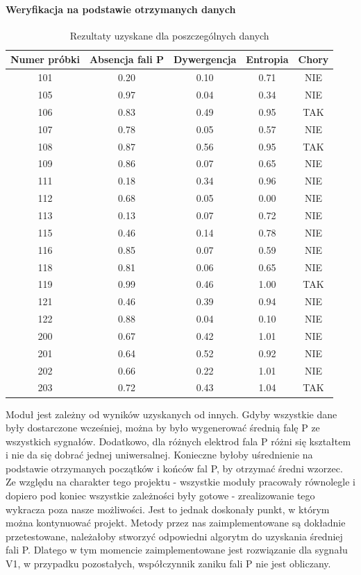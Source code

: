 \paragraph{Weryfikacja na podstawie otrzymanych danych}

\begin{table}[ht]

\centering
    \begin{tabular}{c c c c c}
    \hline \hline
    Numer próbki & Absencja fali P &Dywergencja & Entropia &Chory \\
    \hline
    101 &0.20 &0.10 &0.71 &NIE\\
    105 &0.97 &0.04 &0.34 &NIE\\
    106 &0.83 &0.49 &0.95 &TAK\\
    107 &0.78 &0.05 &0.57 &NIE\\
    108 &0.87 &0.56 &0.95 &TAK\\
    109 &0.86 &0.07 &0.65 &NIE\\
    111 &0.18 &0.34 &0.96 &NIE\\
    112 &0.68 &0.05 &0.00 &NIE\\
    113 &0.13 &0.07 &0.72 &NIE\\
    115 &0.46 &0.14 &0.78 &NIE\\
    116 &0.85 &0.07 &0.59 &NIE\\
    118 &0.81 &0.06 &0.65 &NIE\\
    119 &0.99 &0.46 &1.00 &TAK\\
    121 &0.46 &0.39 &0.94 &NIE\\
    122 &0.88 &0.04 &0.10 &NIE\\
    200 &0.67 &0.42 &1.01 &NIE\\
    201 &0.64 &0.52 &0.92 &NIE\\
    202 &0.66 &0.22 &1.01 &NIE\\
    203 &0.72 &0.43 &1.04 &TAK\\
    \hline
    \end{tabular}
    \caption{Rezultaty uzyskane dla poszczególnych danych}\label{table:wynikiAtrialFibr}
\end{table}

Moduł jest zależny od wyników uzyskanych od innych. 
Gdyby wszystkie dane były dostarczone wcześniej, można by było wygenerować średnią falę P ze wszystkich sygnałów.
Dodatkowo, dla różnych elektrod fala P różni się kształtem i nie da się dobrać jednej uniwersalnej.
Konieczne byłoby uśrednienie na podstawie otrzymanych początków i końców fal P, by otrzymać średni wzorzec.
Ze względu na charakter tego projektu - wszystkie moduły pracowały równolegle i dopiero pod koniec wszystkie zależności były gotowe - 
zrealizowanie tego wykracza poza nasze możliwości.
Jest to jednak doskonały punkt, w którym można kontynuować projekt.
Metody przez nas zaimplementowane są dokładnie przetestowane, należałoby stworzyć odpowiedni algorytm do uzyskania średniej fali P.
Dlatego w tym momencie zaimplementowane jest rozwiązanie dla sygnału V1, w przypadku pozostałych, współczynnik zaniku fali P nie jest obliczany.
